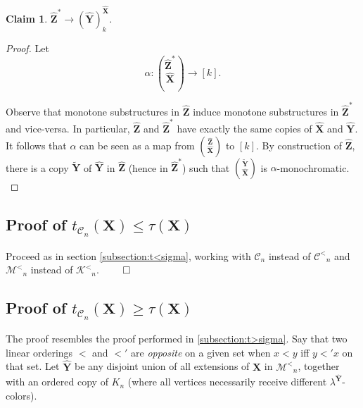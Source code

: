 \documentclass[reqno]{amsart}
\newtheorem{claimm}{Claim}
\begin{document}
\begin{claimm}
${\widehat{\textbf{{Z}}}}^* {\longrightarrow {{({\widehat{\textbf{{Y}}}})}}^{{{\widehat{\textbf{{X}}}}}}_{{k}}}$.
\end{claimm} 

\begin{proof}
Let \[ \alpha : {{\binom{{\widehat{\textbf{{Z}}}}^*}{{\widehat{\textbf{{X}}}}}} \longrightarrow {[k]}}. \]

Observe that monotone substructures in ${\widehat{\textbf{{Z}}}}$ induce monotone substructures in ${\widehat{\textbf{{Z}}}} ^*$ and vice-versa. In particular, ${\widehat{\textbf{{Z}}}}$ and ${\widehat{\textbf{{Z}}}} ^*$ have exactly the same copies of ${\widehat{\textbf{{X}}}}$ and ${\widehat{\textbf{{Y}}}}$. It follows that $\alpha$ can be seen as a map from $\binom{{\widehat{\textbf{{Z}}}}}{{\widehat{\textbf{{X}}}}}$ to $[k]$. By construction of ${\widehat{\textbf{{Z}}}}$, there is a copy ${\widetilde{\textbf{{Y}}}}$ of ${\widehat{\textbf{{Y}}}}$ in ${\widehat{\textbf{{Z}}}}$ (hence in ${\widehat{\textbf{{Z}}}}^*$) such that $\binom{{\widetilde{\textbf{{Y}}}}}{{\widehat{\textbf{{X}}}}}$ is $\alpha$-monochromatic. $\qedhere$ \end{proof}

\subsection{Proof of $t_{{\mathcal{C}} _n}({\textbf{{X}}}) \leq \tau({\textbf{{X}}})$}

Proceed as in section \ref{subsection:t<sigma}, working with ${\mathcal{C}} _n$ instead of ${\mathcal{C}^<} _n$ and ${\mathcal{M}^<} _n$ instead of ${\mathcal{K}^<} _n$. $\qed$ 

\subsection{Proof of $t_{{\mathcal{C}} _n}({\textbf{{X}}}) \geq \tau({\textbf{{X}}})$}

The proof resembles the proof performed in \ref{subsection:t>sigma}. Say that two linear orderings $<$ and $<'$ are \emph{opposite} on a given set when $x<y$ iff $y<'x$ on that set. Let ${\widehat{\textbf{{Y}}}}$ be any disjoint union of all extensions of ${\textbf{{X}}}$ in ${\mathcal{M}^<} _n$, together with an ordered copy of $K_n$ (where all vertices necessarily receive different $\lambda^{{\widehat{\textbf{{Y}}}}}$-colors). 

  
\end{document}
